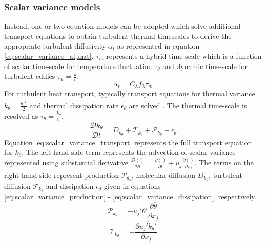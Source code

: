 \subsubsection{Scalar variance models}

Instead, one or two equation models can be adopted which solve additional transport equations to obtain turbulent thermal timescales to derive the appropriate turbulent diffusivity $\alpha_{t}$ as represented in equation \ref{eq:scalar_variance_alphat}. $\tau_{m}$ represents a hybrid time-scale which is a function of scalar time-scale for temperature fluctuation $\tau_{\theta}$ and dynamic time-scale for turbulent eddies $\tau_{u} = \frac{k}{\epsilon}$. 
\begin{equation}
\label{eq:scalar_variance_alphat}
\alpha_{t} = C_{\lambda}f_{\lambda}\tau_{m}
\end{equation}
For turbulent heat transport, typically transport equations for thermal variance $k_{\theta} =\frac{\overline{\theta'^{2}}}{2}$ and thermal dissipation rate $\epsilon_{\theta}$ are solved \cite{Launder2001}. The thermal time-scale is resolved as $\tau_{\theta} = \frac{k_{\theta}}{\epsilon_{\theta}}$. 
\begin{equation}
\label{eq:scalar_variance_transport}
\frac{\mathcal{D} k_{\theta}}{\mathcal{D} t} = D_{k_{\theta}} + \mathcal{T}_{k_{\theta}} + \mathcal{P}_{k_{\theta}} - \epsilon_{\theta}
\end{equation}
Equation \ref{eq:scalar_variance_transport} represents the full transport equation for $k_{\theta}$. The left hand side term represents the advection of scalar variance represented using substantial derivative $\frac{\mathcal{D} ()}{\mathcal{D} t} = \frac{\partial ()}{\partial t} + u_{j}\frac{\partial ()}{\partial x_{j}}$. The terms on the right hand side represent production $\mathcal{P}_{\theta_{k}}$, molecular diffusion $D_{k_{\theta}}$, turbulent diffusion $\mathcal{T}_{k_{\theta}}$ and dissipation $\epsilon_{\theta}$ given in equations \ref{eq:scalar_variance_production} - \ref{eq:scalar_variance_dissipation}, respectively.
\begin{equation}
\label{eq:scalar_variance_production}
\mathcal{P}_{k_{\theta}} = -\overline{u_{j}'\theta'}\frac{\partial \overline{\theta}}{\partial x_{j}}
\end{equation}
\begin{equation}
\label{eq:scalar_variance_tdiffusion}
\mathcal{T}_{k_{\theta}} = -\frac{\partial \overline{u_{j}'k_{\theta}'}}{\partial x_{j}}
\end{equation}

